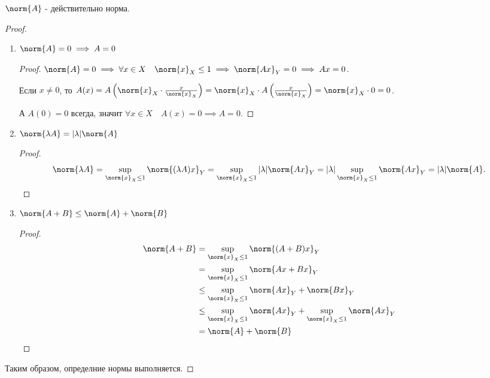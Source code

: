 \begin{lemma} \thmslashn

    $\norm{A}$ - действительно норма.
    \begin{proof} \thmslashn
    
        \begin{enumerate}
            \item $\norm{A} = 0 \implies A = 0$ 
                \begin{proof} \thmslashn
                
                    $\norm{A} = 0 \implies \forall{x\in X}\quad \norm{x}_{X} \le 1 \implies \norm{Ax}_{Y} = 0 \implies Ax = 0$.

                    Если $x \neq 0$, то $A(x) = A\left( \norm{x}_{X} \cdot \frac{x}{\norm{x}_{X}} \right) = \norm{x}_{X} \cdot  A\left( \frac{x}{\norm{x}_{X}} \right) = \norm{x}_{X} \cdot 0 = 0$.

                    А $A(0) = 0$ всегда, значит $\forall{x\in X}\quad A(x) = 0 \implies A = 0$.
                \end{proof}
            \item $\norm{\lambda A} = |\lambda| \norm{A}$ 
                \begin{proof} \thmslashn
                
                    \[ \norm{\lambda A} = \sup\limits_{\norm{x}_{X} \le 1} \norm{(\lambda A)x}_{Y} = \sup\limits_{\norm{x}_{X} \le 1} |\lambda| \norm{Ax}_{Y} = |\lambda| \sup\limits_{\norm{x}_{X} \le 1} \norm{Ax}_{Y} = |\lambda| \norm{A} .\qedhere\] 
                \end{proof}
            \item $\norm{A + B} \le \norm{A} + \norm{B}$ 
                \begin{proof} \thmslashn
               
                    \begin{equation*}
                        \begin{split}
                            \norm{A + B}
                            &= \sup\limits_{\norm{x}_{X} \le 1} \norm{(A+B)x}_{Y}\\
                            &= \sup\limits_{\norm{x}_{X} \le 1} \norm{Ax + Bx}_{Y}\\
                            &\le \sup\limits_{\norm{x}_{X} \le 1} \norm{Ax}_{Y} + \norm{Bx}_{Y}\\
                            &\le \sup\limits_{\norm{x}_{X} \le 1} \norm{Ax}_{Y} + \sup\limits_{\norm{x}_{X} \le 1} \norm{Ax}_{Y}\\
                            &= \norm{A} + \norm{B} \qedhere
                        \end{split}
                    \end{equation*}
                \end{proof}
        \end{enumerate}

        Таким образом, определние нормы выполняется.
    \end{proof}
\end{lemma}
